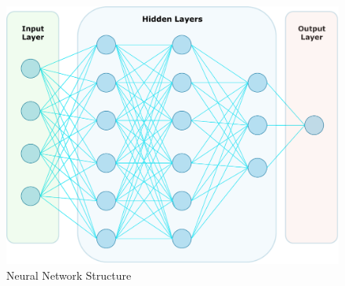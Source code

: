 \documentclass[12pt,a4paper,english
]{tunithesis}
\begin{document}
\begin{figure}
  \begin{center}
    \includegraphics[width=1\textwidth]{thesis/img/neural_network.pdf}
  \end{center}
  \caption[Neural Network]{Neural Network Structure}
  \label{fig:neural_network}
\end{figure}
\end{document}
